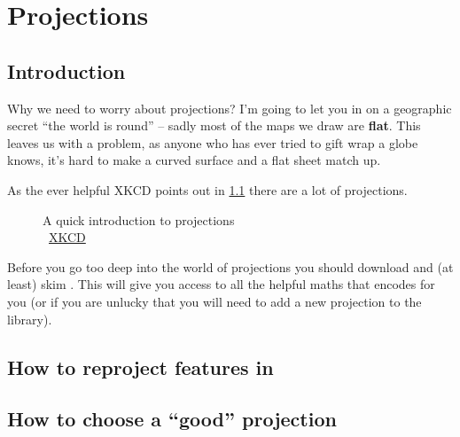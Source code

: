\chapter{Projections}
\section{Introduction}
Why we need to worry about projections? I'm going to let you in on a geographic secret ``the world is round'' -- sadly most of the maps we draw are \textbf{flat}. This leaves us with a problem, as anyone who has ever tried to gift wrap a globe knows, it's hard to make a curved surface and a flat sheet match up. 

As the ever helpful XKCD points out in \cref{xkcd-projections} there are a lot of projections.

\begin{figure}[htbp]
{%
\setlength{\fboxsep}{0pt}%
\setlength{\fboxrule}{1pt}%
%
}%

\caption{A quick introduction to projections\\ \ccbync~\href{http://xkcd.com/977/}{XKCD}}
\label{xkcd-projections}
\end{figure}

Before you go too deep into the world of projections you should download and (at least) skim \cite{snyder}. This will give you access to all the helpful maths that \GeoTools encodes for you (or if you are unlucky that you will need to add a new projection to the library).

\section{How to reproject features in \GeoTools}
\section{How to choose a ``good'' projection}